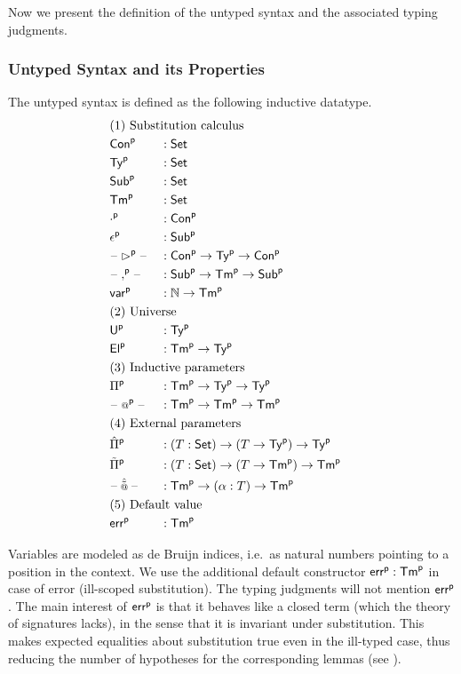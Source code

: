 Now we present the definition of the untyped syntax and the
associated typing judgments.

\subsubsection{Untyped Syntax and its Properties}

\begin{definition}
The untyped syntax is defined as the following inductive datatype.
\begin{alignat*}{5}
  & \rlap{(1) Substitution calculus} \\
  & \Conu && : \Set \\
  & \Tyu  && : \Set \\
  & \Subu  && : \Set \\
  & \Tmu  && : \Set \\
  & \emptyu && : \Conu \\
    & \epsilonu && : \Subu \\
  & \blank\extu\blank && : \Conu\ra\Tyu\ra\Conu \\
  & \blank\consu\blank && : \Subu\ra\Tmu\ra\Subu \\
  & \varu  && : \N \ra \Tmu \\
  & \rlap{(2) Universe} \\
  & \Uu && : \Tyu \\
  & \Elu && : \Tmu\ra\Tyu \\
  & \rlap{(3) Inductive parameters} \\
  & \Piu && : \Tmu\ra\Tyu\ra\Tyu \\
  & \blank\appu\blank && : \Tmu\ra\Tmu\ra \Tmu \\
  & \rlap{(4) External parameters} \\
  & \Pimu && : (T:\Set)\ra(T\ra\Tyu)\ra\Tyu \\
  & \Piiu && : (T:\Set)\ra(T\ra\Tmu)\ra\Tmu \\
  & \blank\appmu \blank && : \Tmu\ra(\alpha:T) \ra\Tmu\\
  & \rlap{(5) Default value} \\
  & \erru && : \Tmu
\end{alignat*}
\end{definition}
Variables are modeled as de Bruijn indices, i.e.\ as natural numbers
pointing to a position in the context. We use the additional default
constructor ${\mathsf{err}}^{\mathsf{p}}:{\mathsf{Tm}}^{\mathsf{p}}$ in case of error (ill-scoped
substitution). The typing judgments will not mention ${\mathsf{err}}^{\mathsf{p}}$.  The
main interest of ${\mathsf{err}}^{\mathsf{p}}$ is that it behaves like a closed term (which
the theory of signatures lacks), in the sense that it is invariant
under substitution. This makes expected equalities about substitution
true even in the ill-typed case, thus reducing the number of
hypotheses for the corresponding lemmas (see
).

